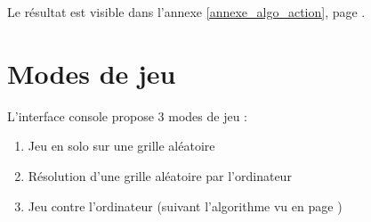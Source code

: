Le résultat est visible dans l'annexe \ref{annexe_algo_action}, page \pageref{annexe_algo_action}.





\section{Modes de jeu}
L'interface console propose 3 modes de jeu :
\begin{enumerate}
\item Jeu en solo sur une grille aléatoire
\item Résolution d'une grille aléatoire par l'ordinateur
\item Jeu contre l'ordinateur (suivant l'algorithme vu en page \pageref{alogo_jeu})
\end{enumerate}